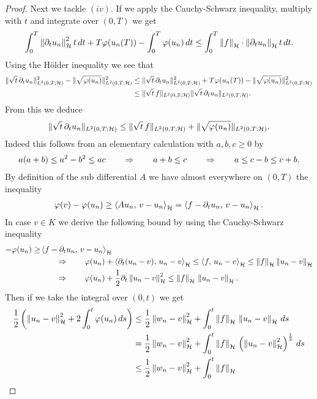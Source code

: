 \begin{proof}
	Next we tackle $ (iv) $. If we apply the Cauchy-Schwarz inequality, multiply
	with $ t $ and integrate over $ (0,T) $ we get
	\begin{align*}
		\int_0^T\left\Vert \partial_t u_n\right\Vert_{\mathcal{H}}^2 t\,dt
		+ T\varphi(u_n(T))
		-\int_0^T \varphi(u_n)\,dt
		\leq \int_0^T\left\Vert f\right\Vert_{\mathcal{H}}\cdot \left\Vert \partial_t u_n\right\Vert_{\mathcal{H}} t\,dt.
	\end{align*}
	Using the Hölder inequality we see that
	\begin{align*}
		\Vert \sqrt{t}\,\partial_t u_n\Vert_{L^2(0,T;\mathcal{H})}^2
		-\Vert \sqrt{\varphi(u_n)}\Vert_{L^2(0,T;\mathcal{H})}^2
		&\leq 
		\Vert \sqrt{t}\,\partial_t u_n\Vert_{L^2(0,T;\mathcal{H})}^2
		+ T\varphi(u_n(T))
		-\Vert \sqrt{\varphi(u_n)}\Vert_{L^2(0,T;\mathcal{H})}^2\\
		&\leq \Vert \sqrt{t}\,f\Vert_{L^2(0,T;\mathcal{H})}\Vert \sqrt{t}\,\partial_t u_n\Vert_{L^2(0,T;\mathcal{H})}.
	\end{align*}
	From this we deduce
	\begin{align}\label{eq2:theorem:SGD prop of sub diff with f in ltwo}
		\Vert \sqrt{t}\,\partial_t u_n\Vert_{L^2(0,T;\mathcal{H})}
		\leq\Vert \sqrt{t}\,f\Vert_{L^2(0,T;\mathcal{H})}
		+\Vert \sqrt{\varphi(u_n)}\Vert_{L^2(0,T;\mathcal{H})}.
	\end{align}
	Indeed this follows from an elementary calculation 
	with $ a,b,c\geq 0 $ by
	\begin{align*}
		a(a+b)\leq a^2-b^2\leq ac
		\qquad\Rightarrow\qquad
		a+b\leq c
		\qquad\Rightarrow\qquad
		a\leq c-b\leq c+b.
	\end{align*}
	By definition of the sub differential $ A $ we have 
	almost everywhere on $ (0,T) $ the inequality
	\begin{align*}
		\varphi(v)-\varphi(u_n)\geq \left\langle A u_n,\,v-u_n\right\rangle_{\mathcal{H}}=\left\langle f-\partial_t u_n,\,v-u_n\right\rangle_{\mathcal{H}}.
	\end{align*}
	In case $ v\in K $ we derive the following bound by using the Cauchy-Schwarz inequality
	\begin{align*}
		-\varphi(u_n)\geq &\left\langle f-\partial_t u_n,\,v-u_n\right\rangle_{\mathcal{H}}\\
		&\qquad\Rightarrow\qquad
		\varphi(u_n)+\left\langle \partial_t(u_n-v),\,u_n-v\right\rangle_{\mathcal{H}}
		\leq \left\langle f,\,u_n-v\right\rangle_{\mathcal{H}}
		\leq \left\Vert f\right\Vert_{\mathcal{H}}\left\Vert u_n-v\right\Vert_{\mathcal{H}}\\
		&\qquad\Rightarrow\qquad\varphi(u_n)+\frac{1}{2}\partial_t\left\Vert u_n-v\right\Vert_{\mathcal{H}}^2
		\leq \left\Vert f\right\Vert_{\mathcal{H}}\,\left\Vert u_n-v\right\Vert_{\mathcal{H}}.
	\end{align*}
	Then if we take the integral over $ (0,t) $ we get
	\begin{align*}
		\frac{1}{2}\left(\norm{u_n-v}^2+2\int_0^t\vp(u_n)\,ds\right)
		&\leq \frac{1}{2}\norm{w_n-v}^2+\int_0^t\norm{f}\,\norm{u_n-v}\,ds\\
		&= \frac{1}{2}\norm{w_n-v}^2+
		\int_0^t\norm{f}\,
		\left(\norm{u_n-v}^2\right)^{\frac{1}{2}}\,ds\\
		&\leq \frac{1}{2}\norm{w_n-v}^2+
		\int_0^t\norm{f}\,

\end{align*}
\end{proof}
